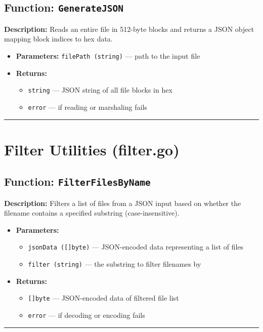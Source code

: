 \documentclass[12pt,a4paper]{article}
\begin{document}
\subsection*{Function: \texttt{GenerateJSON}}
\textbf{Description:} Reads an entire file in 512-byte blocks and returns a JSON object mapping block indices to hex data.
\begin{itemize}[leftmargin=2cm,label={--}]
  \item \textbf{Parameters:} \texttt{filePath (string)} — path to the input file
  \item \textbf{Returns:}
  \begin{itemize}
    \item \texttt{string} — JSON string of all file blocks in hex
    \item \texttt{error} — if reading or marshaling fails
  \end{itemize}
\end{itemize}
\hrule\vspace{2em}

\newpage

\section{Filter Utilities (filter.go)}

\subsection*{Function: \texttt{FilterFilesByName}}
\textbf{Description:} Filters a list of files from a JSON input based on whether the filename contains a specified substring (case-insensitive).
\begin{itemize}[leftmargin=2cm,label={--}]
  \item \textbf{Parameters:}
  \begin{itemize}
    \item \texttt{jsonData ([]byte)} — JSON-encoded data representing a list of files
    \item \texttt{filter (string)} — the substring to filter filenames by
  \end{itemize}
  \item \textbf{Returns:}
  \begin{itemize}
    \item \texttt{[]byte} — JSON-encoded data of filtered file list
    \item \texttt{error} — if decoding or encoding fails
  \end{itemize}
\end{itemize}
\hrule\vspace{2em}
\end{document}
